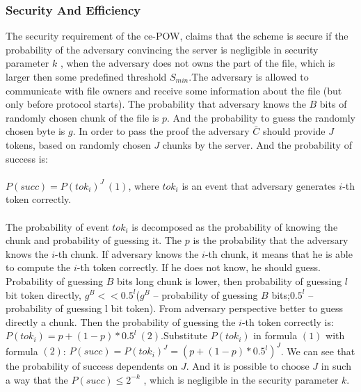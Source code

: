 \documentclass[12pt]{article}
\begin{document}
\subsubsection{Security And Efficiency}
\label{subsub:secAndeff7}
The security requirement of the ce-POW, claims that the scheme is secure if the probability of the adversary convincing the server is negligible in security parameter $k$ , when the adversary does not owns the part of the file, which is larger then some predefined threshold $S_{min}$.The adversary is allowed to communicate with file owners and receive some information about the file (but only before protocol starts). The probability that adversary knows the $B$ bits of randomly chosen chunk of the file is $p$. And the probability to guess the randomly chosen byte is $g$. In order to pass the proof the adversary $\bar{C}$ should provide $J$ tokens, based on randomly chosen $J$ chunks by the server. And the probability of success is:\\\\
$P(succ) = P(tok_i)^J\ (1)$, where $tok_i$ is an event that  adversary generates $i$-th token correctly.\\\\
The probability of event $tok_i$ is decomposed as the probability of knowing the chunk and probability of guessing it. The $p$ is the probability that the adversary knows the $i$-th chunk.  If adversary knows the $i$-th chunk, it means that he is able to compute the $i$-th token correctly. If he does not know, he should guess. Probability of guessing $B$ bits long chunk is lower, then probability of guessing $l$ bit token directly, $g^B << 0.5^l$($g^B$ -- probability of guessing $B$ bits;$0.5^l$ -- probability of guessing l bit token). From adversary perspective better to guess directly a chunk. Then the probability of guessing the $i$-th token correctly is:  $P(tok_i)=p+(1-p)*0.5^l\ (2)$.Substitute $P(tok_i)$ in  formula $(1)$ with  formula $(2)$: $P(succ) = P(tok_i)^J = (p+(1-p)*0.5^l)^J$. We can see that the probability of success dependents on $J$. And it is possible to choose $J$ in such a way that the $P(succ) \leq 2^{-k}$ , which is negligible in the security parameter $k$.\\\\
\end{document}
